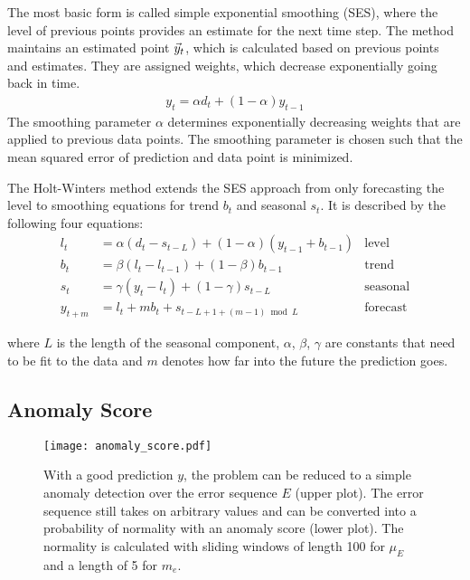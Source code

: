 The most basic form is called simple exponential smoothing (SES), where the
level of previous points provides an estimate for the next time step.  The
method maintains an estimated point $\vec{y}_t$, which is calculated based on
previous points and estimates.  They are assigned weights, which decrease
exponentially going back in time.
\begin{align}
  y_t = \alpha d_t + (1-\alpha)y_{t-1}
\end{align}
The smoothing parameter $\alpha$ determines exponentially
decreasing weights that are applied to previous data points.  The smoothing
parameter is chosen such that the mean squared error of prediction and data
point is minimized.

The Holt-Winters method extends the SES approach from only forecasting the level
to smoothing equations for trend $b_t$ and seasonal $s_t$.
It is described by the following four equations:
\begin{align}
  l_t &= \alpha(d_t - s_{t-L}) + (1-\alpha)(y_{t-1} + b_{t-1}) &\text{level} \\
  b_t &= \beta(l_t - l_{t-1}) + (1-\beta)b_{t-1} &\text{trend} \\
  s_t &= \gamma(y_t - l_t) + (1 - \gamma)s_{t-L} &\text{seasonal} \\
  y_{t+m} &= l_t + m b_t + s_{t-L+1+(m-1) \bmod L} &\text{forecast}
\end{align}

where $L$ is the length of the seasonal component, $\alpha$, $\beta$, $\gamma$
are constants that need to be fit to the data and $m$ denotes how far into
the future the prediction goes.


\subsection{Anomaly Score}%
\label{sub:anomaly_score}

\begin{figure}
  \centering
  \texttt{[image: anomaly\_score.pdf]}
  \caption{With a good prediction $y$, the problem can be reduced to a simple
    anomaly detection over the error sequence $E$ (upper plot). The error
    sequence still takes on arbitrary values and can be converted into a
    probability of normality with an anomaly score (lower plot).
    The normality is calculated with sliding windows of length 100 for $\mu_E$
    and a length of 5 for $m_e$.
  }
  \label{fig:anomaly_score}
\end{figure}


